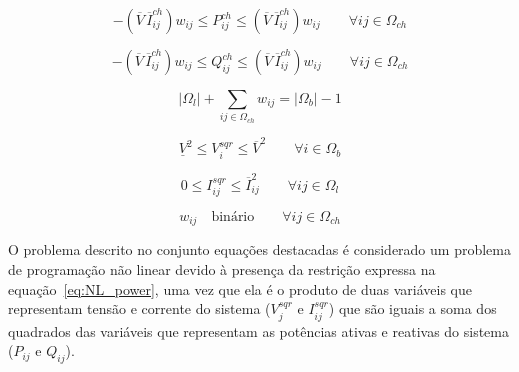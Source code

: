\begin{tcolorbox}[enhanced jigsaw,breakable,pad at break*=1mm,colback=white!10,title =\textbf{Problema de PLIM para RSD}]
\begin{equation*}\label{eq:NL_PAkeys}
    -(\overline{V}\,\overline{I}_{ij}^{ch})w_{ij} \leq P_{ij}^{ch} \leq (\overline{V}\,\overline{I}_{ij}^{ch})w_{ij}\qquad\forall ij\in\Omega_{ch}
\end{equation*}
    
    
\begin{equation*}\label{eq:NL_PRkeys}
    -(\overline{V}\,\overline{I}_{ij}^{ch})w_{ij} \leq Q_{ij}^{ch} \leq (\overline{V}\,\overline{I}_{ij}^{ch})w_{ij}\qquad\forall ij\in\Omega_{ch}   
\end{equation*}
    
\begin{equation*}\label{eq:NL_radialidade}
    |\Omega_{l}| + \sum_{ij\in\Omega_{ch}}w_{ij} = |\Omega_{b}| - 1
\end{equation*}

\begin{equation*}\label{eq:NL_limvoltage}
    \underline{V}^{2} \leq V_{i}^{sqr} \leq \overline{V}^{2}\qquad\forall i \in\Omega_{b}
\end{equation*}

\begin{equation*}\label{eq:NL_limcurrent}
    0 \leq I_{ij}^{sqr} \leq \overline{I}_{ij}^{2} \qquad\forall ij\in\Omega_{l} 
\end{equation*}

\begin{equation*}\label{eq:NL_binario}
    w_{ij}\quad\text{binário}\qquad\forall ij \in\Omega_{ch}
\end{equation*}
\end{tcolorbox}

O problema descrito no conjunto equações destacadas é considerado um problema de programação não linear devido à presença da restrição expressa na equação~\ref{eq:NL_power}, uma vez que ela é o produto de duas variáveis que representam tensão e corrente do sistema ($V_{j}^{sqr}$ e $I_{ij}^{sqr}$) que são iguais a soma dos quadrados das variáveis que representam as potências ativas e reativas do sistema ($P_{ij}$ e $Q_{ij}$).
